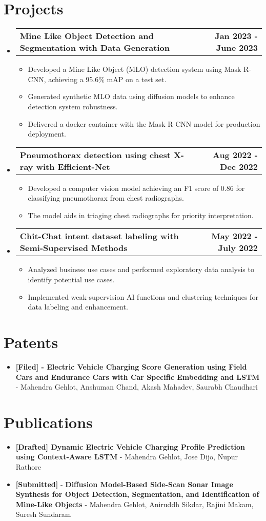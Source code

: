 \documentclass[letterpaper,11pt]{article}
\makeatletter
\newcommand{\resumeItem}[1]{
  \item\small{
    {#1 \vspace{-2pt}}
  }
}
\newcommand{\resumeProjectHeading}[2]{
    \item
    \begin{tabular*}{1.001\textwidth}{l@{\extracolsep{\fill}}r}
      \small#1 & \textbf{\small #2}\\
    \end{tabular*}\vspace{-7pt}
}
\newcommand{\resumeSubHeadingListStart}{\begin{itemize}[leftmargin=0.0in, label={}]}
\newcommand{\resumeSubHeadingListEnd}{\end{itemize}}
\newcommand{\resumeItemListStart}{\begin{itemize}}
\newcommand{\resumeItemListEnd}{\end{itemize}\vspace{-5pt}}
\makeatother
\begin{document}
\section{Projects}
    \resumeSubHeadingListStart
      \resumeProjectHeading
          {\textbf{Mine Like Object Detection and Segmentation with Data Generation}}{Jan 2023 - June 2023}
          \resumeItemListStart
            \resumeItem{Developed a Mine Like Object (MLO) detection system using Mask R-CNN, achieving a 95.6\% mAP on a test set.}
            \resumeItem{Generated synthetic MLO data using diffusion models to enhance detection system robustness.}
            \resumeItem{Delivered a docker container with the Mask R-CNN model for production deployment.}
          \resumeItemListEnd
      \resumeProjectHeading
          {\textbf{Pneumothorax detection using chest X-ray with Efficient-Net}}{Aug 2022 - Dec 2022}
          \resumeItemListStart
            \resumeItem{Developed a computer vision model achieving an F1 score of 0.86 for classifying pneumothorax from chest radiographs.}
            \resumeItem{The model aids in triaging chest radiographs for priority interpretation.}
          \resumeItemListEnd     
      \resumeProjectHeading
          {\textbf{Chit-Chat intent dataset labeling with Semi-Supervised Methods}}{May 2022 - July 2022}
          \resumeItemListStart
            \resumeItem{Analyzed business use cases and performed exploratory data analysis to identify potential use cases.}
            \resumeItem{Implemented weak-supervision AI functions and clustering techniques for data labeling and enhancement.}
          \resumeItemListEnd
    \resumeSubHeadingListEnd

\section{Patents}
\resumeItemListStart
\resumeItem{\textbf{[Filed] - Electric Vehicle Charging Score Generation using Field Cars and Endurance Cars with Car Specific Embedding and LSTM} - Mahendra Gehlot, Anshuman Chand, Akash Mahadev, Saurabh Chaudhari}
\resumeItemListEnd

\section{Publications}
\resumeItemListStart
\resumeItem{\textbf{[Drafted] Dynamic Electric Vehicle Charging Profile Prediction using Context-Aware LSTM} - Mahendra Gehlot, Jose Dijo, Nupur Rathore}
\resumeItem{\textbf{[Submitted]} - \textbf{Diffusion Model-Based Side-Scan Sonar Image Synthesis for Object Detection, Segmentation, and Identification of Mine-Like Objects} - Mahendra Gehlot, Aniruddh Sikdar, Rajini Makam, Suresh Sundaram}
\resumeItemListEnd
\end{document}
